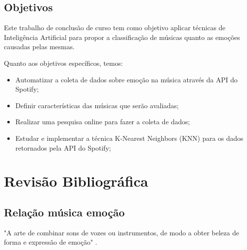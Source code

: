 \documentclass[
	12pt,				%
	openright,			%
	oneside,
	a4paper,			%
	english,			%
	french,				%
	spanish,			%
	brazil				%
	]{abntex2}
\begin{document}
 

\newpage

\section{Objetivos}
Este trabalho de conclusão de curso tem como objetivo aplicar técnicas de Inteligência Artificial para propor a classificação de músicas quanto as emoções causadas pelas mesmas.

Quanto aos objetivos específicos, temos:
    \begin{itemize}
        \item Automatizar a coleta de dados sobre emoção na música através da API do Spotify;
        \item Definir características das músicas que serão avaliadas;
        \item Realizar uma pesquisa online para fazer a coleta de dados;
        \item Estudar e implementar a técnica K-Nearest Neighbors (KNN) para os dados retornados pela API do Spotify;

    \end{itemize}
    
\chapter[Revisão Bibliográfica]{Revisão Bibliográfica}
    
\section{Relação música emoção}

"A arte de combinar sons de vozes ou instrumentos, de modo a obter beleza de forma e expressão de emoção" \cite{sykes1982concise}.
\end{document}
